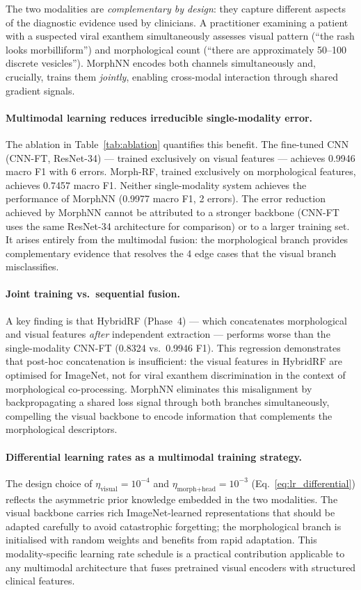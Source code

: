 \documentclass[preprint,12pt]{elsarticle}
\begin{document}
The two modalities are \emph{complementary by design}: they capture
different aspects of the diagnostic evidence used by clinicians.
A practitioner examining a patient with a suspected viral exanthem
simultaneously assesses visual pattern (``the rash looks morbilliform'')
and morphological count (``there are approximately 50--100 discrete
vesicles'').  MorphNN encodes both channels simultaneously and, crucially,
trains them \emph{jointly}, enabling cross-modal interaction through
shared gradient signals.

\paragraph{Multimodal learning reduces irreducible single-modality error.}
The ablation in Table~\ref{tab:ablation} quantifies this benefit.  The
fine-tuned CNN (CNN-FT, ResNet-34) --- trained exclusively on visual
features --- achieves 0.9946 macro F1 with 6 errors.  Morph-RF,
trained exclusively on morphological features, achieves 0.7457 macro F1.
Neither single-modality system achieves the performance of MorphNN
(0.9977 macro F1, 2 errors).  The error reduction achieved by MorphNN
cannot be attributed to a stronger backbone (CNN-FT uses the same
ResNet-34 architecture for comparison) or to a larger training set.  It
arises entirely from the multimodal fusion: the morphological branch
provides complementary evidence that resolves the 4 edge cases that
the visual branch misclassifies.

\paragraph{Joint training vs.\ sequential fusion.}
A key finding is that HybridRF (Phase~4) --- which concatenates
morphological and visual features \emph{after} independent extraction
--- performs worse than the single-modality CNN-FT (0.8324 vs.\ 0.9946
F1).  This regression demonstrates that post-hoc concatenation is
insufficient: the visual features in HybridRF are optimised for
ImageNet, not for viral exanthem discrimination in the context of
morphological co-processing.  MorphNN eliminates this misalignment
by backpropagating a shared loss signal through both branches
simultaneously, compelling the visual backbone to encode information
that complements the morphological descriptors.

\paragraph{Differential learning rates as a multimodal training strategy.}
The design choice of $\eta_{\text{visual}} = 10^{-4}$ and
$\eta_{\text{morph+head}} = 10^{-3}$ (Eq.~\eqref{eq:lr_differential})
reflects the asymmetric prior knowledge embedded in the two modalities.
The visual backbone carries rich ImageNet-learned representations that
should be adapted carefully to avoid catastrophic forgetting; the
morphological branch is initialised with random weights and benefits
from rapid adaptation.  This modality-specific learning rate schedule
is a practical contribution applicable to any multimodal architecture
that fuses pretrained visual encoders with structured clinical features.
\end{document}
